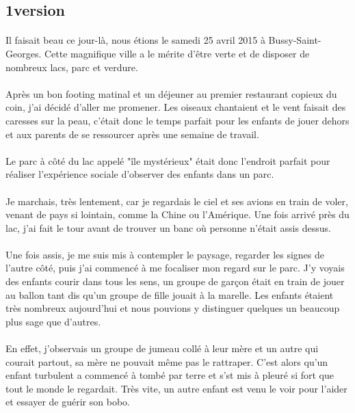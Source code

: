 \subsection{1\ier version}
\paragraph{}
Il faisait beau ce jour-là, nous étions le samedi 25 avril
2015 à Bussy-Saint-Georges. Cette magnifique ville a le
mérite d'être verte et de disposer de nombreux lacs, parc
et verdure.
\paragraph{}
Après un bon footing matinal et un déjeuner au premier
restaurant copieux du coin, j'ai décidé d'aller me
promener. Les oiseaux chantaient et le vent faisait des
caresses sur la peau, c'était donc le temps parfait pour les
enfants de jouer dehors et aux parents de se ressourcer
après une semaine de travail.
\paragraph{}
Le parc à côté du lac appelé "île mystérieux" était donc
l'endroit parfait pour réaliser l'expérience sociale
d'observer des enfants dans un parc.
\paragraph{}
Je marchais, très lentement, car je regardais le ciel et ses
avions en train de voler, venant de pays si lointain, comme
la Chine ou l'Amérique. Une fois arrivé près du lac, j'ai fait
le tour avant de trouver un banc où personne n'était assis
dessus.
\paragraph{}
Une fois assis, je me suis mis à contempler le paysage,
regarder les signes de l'autre côté, puis j'ai commencé à
me focaliser mon regard sur le parc. J'y voyais des
enfants courir dans tous les sens, un groupe de garçon
était en train de jouer au ballon tant dis qu'un groupe de
fille jouait à la marelle. Les enfants étaient très nombreux
aujourd'hui et nous pouvions y distinguer quelques un
beaucoup plus sage que d'autres.
\paragraph{}
En effet, j'observais un groupe de jumeau collé à leur
mère et un autre qui courait partout, sa mère ne pouvait
même pas le rattraper. C'est alors qu'un enfant turbulent a
commencé à tombé par terre et s'st mis à pleuré si fort
que tout le monde le regardait. Très vite, un autre enfant
est venu le voir pour l'aider et essayer de guérir son bobo.
